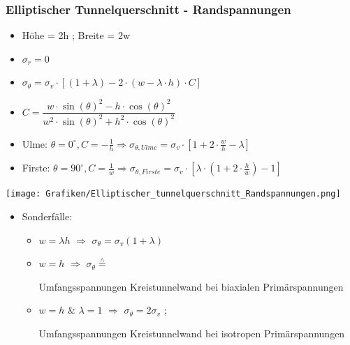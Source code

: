 \documentclass[fleqn,twoside]{article}
\begin{document}
\subsubsection{Elliptischer Tunnelquerschnitt - Randspannungen}
\begin{minipage}{0.72\textwidth}
\begin{itemize}
    \item Höhe = 2h ; Breite = 2w
	\item $\sigma_r = 0$
	\item $\sigma_\theta = \sigma_v \cdot [(1+\lambda)-2\cdot (w-\lambda\cdot h)\cdot C]$
	\item $C=\dfrac{w \cdot \sin(\theta)^2-h\cdot \cos(\theta)^2}{w^2 \cdot \sin(\theta)^2 + h^2 \cdot \cos(\theta)^2}$
	\item Ulme: $\theta = 0^\circ , C = -\frac{1}{h} \Rightarrow \sigma_{\theta,Ulme} = \sigma_v \cdot \left[ 1+ 2 \cdot \frac{w}{h}-\lambda \right]$
	\item Firste: $\theta = 90^\circ , C = \frac{1}{w} \Rightarrow \sigma_{\theta,Firste} = \sigma_v \cdot \left[\lambda \cdot (1+2\cdot \frac{h}{w})-1 \right]$
\end{itemize}
\end{minipage}
\begin{minipage}{0.27\textwidth}
    \texttt{[image: Grafiken/Elliptischer\_tunnelquerschnitt\_Randspannungen.png]}
\end{minipage}
\begin{itemize}
    \item Sonderfälle:
    \begin{itemize}
        \item  $w = \lambda h$ $\Rightarrow$ $\sigma_\theta = \sigma_v (1+\lambda)$
        \item $w=h$ $\Rightarrow$ $\sigma_\theta \overset{\wedge}{=} $ \begin{footnotesize} Umfangsspannungen Kreistunnelwand bei biaxialen Primärspannungen \end{footnotesize}
        \item $w=h$ \& $\lambda = 1$ $\Rightarrow$ $\sigma_\theta = 2\sigma_v$ ; \begin{footnotesize} Umfangsspannungen Kreistunnelwand bei isotropen Primärspannungen \end{footnotesize}
    \end{itemize}
\end{itemize}
\end{document}
